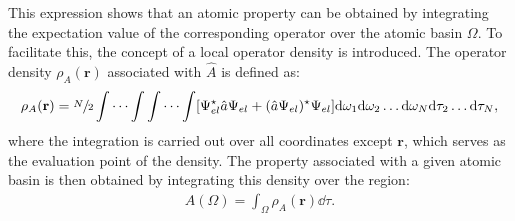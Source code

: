 This expression shows that an atomic property can be obtained by
integrating the expectation value of the corresponding operator over the atomic
basin $\Omega$.
To facilitate this, the concept of a local operator density is introduced. The
operator density $\rho_{A}(\mathbf{r})$ associated with $\hat{A}$ is defined as:
%
\begin{align}
  \rho_{A}(\mathbf{r}) = \sfrac{N}{2}\int\cdots\int\int\cdots\int[
  \Psi_{el}^{\star}\hat{a}\Psi_{el} + (\hat{a}\Psi_{el})^{\star}\Psi_{el}]
  \dd\omega_1\dd\omega_2\ldots \dd\omega_N\dd\tau_2\ldots \dd\tau_N ,
\end{align}
%
\noindent where the integration is carried out over all coordinates except
$\mathbf{r}$, which serves as the evaluation point of the density. The property
associated with a given atomic basin is then obtained by integrating this
density over the region:
%
\begin{align}
  A(\Omega)=\int_{\Omega}\rho_{A}(\mathbf{r})\dd\tau .
\end{align}

